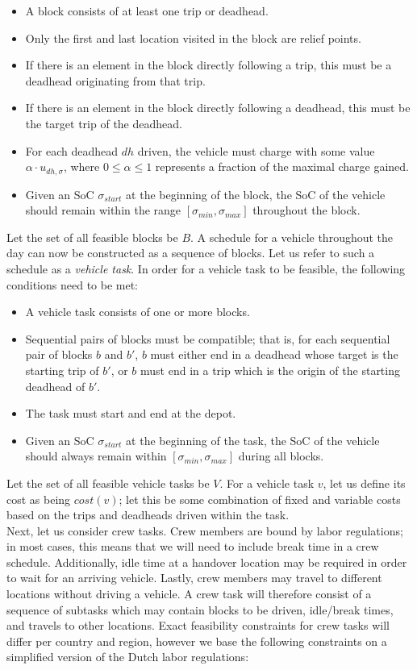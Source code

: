 \documentclass[]{article}
\begin{document}
\begin{itemize}
  \item A block consists of at least one trip or deadhead.
  \item Only the first and last location visited in the block are relief points.
  \item If there is an element in the block directly following a trip, this must be a deadhead originating from that trip.
  \item If there is an element in the block directly following a deadhead, this must be the target trip of the deadhead.
  \item For each deadhead $dh$ driven, the vehicle must charge with some value $\alpha \cdot u_{dh,\sigma}$, where $0 \leq \alpha \leq 1$ represents a fraction of the maximal charge gained. 
  \item Given an SoC $\sigma_{start}$ at the beginning of the block, the SoC of the vehicle should remain within the range $[ \sigma_{min}, \sigma_{max} ]$ throughout the block.
\end{itemize}
Let the set of all feasible blocks be $B$. A schedule for a vehicle throughout the day can now be constructed as a sequence of blocks. Let us refer to such a schedule as a \textit{vehicle task}. In order for a vehicle task to be feasible, the following conditions need to be met:
\begin{itemize}
  \item A vehicle task consists of one or more blocks. 
  \item Sequential pairs of blocks must be compatible; that is, for each sequential pair of blocks $b$ and $b'$, $b$ must either end in a deadhead whose target is the starting trip of $b'$, or $b$ must end in a trip which is the origin of the starting deadhead of $b'$.
  \item The task must start and end at the depot. 
  \item Given an SoC $\sigma_{start}$ at the beginning of the task, the SoC of the vehicle should always remain within $[ \sigma_{min}, \sigma_{max} ]$ during all blocks.
\end{itemize}
Let the set of all feasible vehicle tasks be $V$. For a vehicle task $v$, let us define its cost as being $cost(v)$; let this be some combination of fixed and variable costs based on the trips and deadheads driven within the task. \\
Next, let us consider crew tasks. Crew members are bound by labor regulations; in most cases, this means that we will need to include break time in a crew schedule. Additionally, idle time at a handover location may be required in order to wait for an arriving vehicle. Lastly, crew members may travel to different locations without driving a vehicle. A crew task will therefore consist of a sequence of subtasks which may contain blocks to be driven, idle/break times, and travels to other locations. Exact feasibility constraints for crew tasks will differ per country and region, however we base the following constraints on a simplified version of the Dutch labor regulations: 
\end{document}
